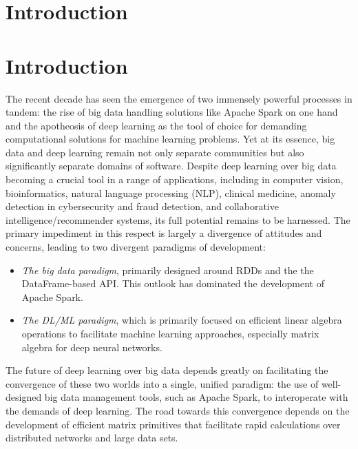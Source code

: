 \documentclass[bdcc,article,submit,moreauthors,pdftex]{Definitions/mdpi}
\begin{document}

\section{Introduction}
\section{Introduction} %
\label{sec:introduction}

The recent decade has seen the emergence of two immensely powerful processes in tandem: the rise of big data handling solutions like Apache Spark on one hand and the apotheosis of deep learning as the tool of choice for demanding computational solutions for machine learning problems. Yet at its essence, big data and deep learning remain not only separate communities but also significantly separate domains of software. Despite deep learning over big data becoming a crucial tool in a range of applications, including in computer vision,\cite{guo2016deep,voulodimos2018deep}  bioinformatics,\cite{spencer2014deep,alipanahi2015predicting,zhang2016deep,wei2018prediction} natural language processing (NLP),\cite{deselaers2009deep,socher2012deep,young2018recent,otter2020survey} clinical medicine,\cite{bar2015chest,havaei2016deep,liu2017detecting,stead2018clinical,campanella2019clinical,lehman2019mammographic} anomaly detection in cybersecurity and fraud detection,\cite{du2017deeplog,shone2018deep,chalapathy2019deep} and collaborative intelligence/recommender systems,\cite{wang2015collaborative,deng2016deep,karatzoglou2017deep,batmaz2019review} its full potential remains to be harnessed. The primary impediment in this respect is largely a divergence of attitudes and concerns, leading to two divergent paradigms of development:

\begin{itemize}
	\item \emph{The big data paradigm}, primarily designed around RDDs and the the DataFrame-based API. This outlook has dominated the development of Apache Spark.
	\item \emph{The DL/ML paradigm}, which is primarily focused on efficient linear algebra operations to facilitate machine learning approaches, especially matrix algebra for deep neural networks.
\end{itemize}


The future of deep learning over big data depends greatly on facilitating the convergence of these two worlds into a single, unified paradigm: the use of well-designed big data management tools, such as Apache Spark, to interoperate with the demands of deep learning. The road towards this convergence depends on the development of efficient matrix primitives that facilitate rapid calculations over distributed networks and large data sets.
\end{document}
